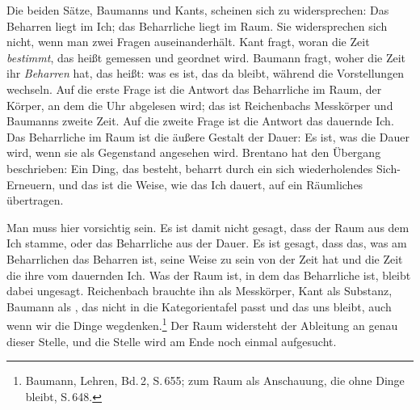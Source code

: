Die beiden Sätze, Baumanns und Kants, scheinen sich zu widersprechen: Das Beharren liegt im Ich; das Beharrliche liegt im Raum. Sie widersprechen sich nicht, wenn man zwei Fragen auseinanderhält. Kant fragt, woran die Zeit \emph{bestimmt}, das heißt gemessen und geordnet wird. Baumann fragt, woher die Zeit ihr \emph{Beharren} hat, das heißt: was es ist, das da bleibt, während die Vorstellungen wechseln. Auf die erste Frage ist die Antwort das Beharrliche im Raum, der Körper, an dem die Uhr abgelesen wird; das ist Reichenbachs Messkörper und Baumanns zweite Zeit. Auf die zweite Frage ist die Antwort das dauernde Ich. Das Beharrliche im Raum ist die äußere Gestalt der Dauer: Es ist, was die Dauer wird, wenn sie als Gegenstand angesehen wird. Brentano hat den Übergang beschrieben: Ein Ding, das besteht, beharrt durch ein sich wiederholendes Sich-Erneuern, und das ist die Weise, wie das Ich dauert, auf ein Räumliches übertragen.

Man muss hier vorsichtig sein. Es ist damit nicht gesagt, dass der Raum aus dem Ich stamme, oder das Beharrliche aus der Dauer. Es ist gesagt, dass das, was am Beharrlichen das Beharren ist, seine Weise zu sein von der Zeit hat und die Zeit die ihre vom dauernden Ich. Was der Raum ist, in dem das Beharrliche ist, bleibt dabei ungesagt. Reichenbach brauchte ihn als Messkörper, Kant als Substanz, Baumann als , das nicht in die Kategorientafel passt und das uns bleibt, auch wenn wir die Dinge wegdenken.\footnote{Baumann, Lehren, Bd.\,2, S.\,655; zum Raum als Anschauung, die ohne Dinge bleibt, S.\,648.} Der Raum widersteht der Ableitung an genau dieser Stelle, und die Stelle wird am Ende noch einmal aufgesucht.
